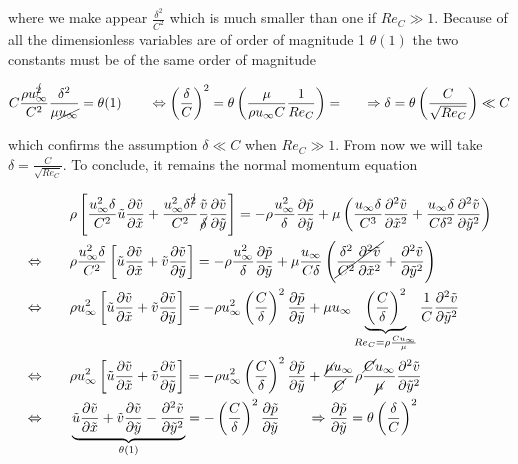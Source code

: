 	where we make appear $\frac{\delta ^2}{C^2}$ which is much smaller than one if $Re_C \gg 1$. Because of all the dimensionless variables are of order of magnitude 1 $\theta (1)$ the two constants must be of the same order of magnitude
	
	\begin{equation}
		C\frac{\rho \uinf ^{\cancel{2}}}{C^2} \frac{\delta ^2}{\mu \cancel{\uinf}} = \theta (1) \qquad \Leftrightarrow \left( \frac{\delta}{C}\right)^2 = \theta \left( \frac{\mu}{\rho \uinf C}\frac{1}{Re _C} \right) =  \qquad \Rightarrow \delta = \theta \left(\frac{C}{\sqrt{Re_C}} \right) \ll C
	\end{equation}
	
	which confirms the assumption $\delta \ll C$ when $Re_C\gg 1$. From now we will take $\delta = \frac{C}{\sqrt{Re_C}}$. To conclude, it remains the normal momentum equation 
	
	\begin{equation}
	\begin{aligned}
		&\rho \left[ \frac{\uinf ^2 \delta}{C^2}\tilde{u} \frac{\D \tilde{v}}{\D \tilde{x}} + \frac{\uinf ^2 \delta^{\cancel{2}}}{C^2} \frac{\tilde{v}}{\cancel{\delta}}\frac{\D \tilde{v}}{\D \tilde{y}} \right] = -\rho \frac{\uinf ^2}{\delta} \frac{\D \tilde{p}}{\D \tilde{y}} + \mu \left( \frac{\uinf \delta}{C^3}\frac{\D ^2 \tilde{v}}{\D \tilde{x}^2} + \frac{\uinf\delta}{C\delta ^{2}}\frac{\D ^2 \tilde{v}}{\D \tilde{y}^2} \right) \\
		\Leftrightarrow\qquad &\rho \frac{\uinf ^2\delta}{C^2}\left[ \tilde{u} \frac{\D \tilde{v}}{\D \tilde{x}} +  \tilde{v} \frac{\D \tilde{v}}{\D \tilde{y}}  \right] = - \rho\frac{\uinf ^2}{\delta} \frac{\D \tilde{p}}{\D \tilde{y}} +  \mu \frac{\uinf }{C\delta} \left( \cancel{\frac{\delta ^2}{C^2}\frac{\D ^2 \tilde{v}}{\D \tilde{x}^2}}+ \frac{\D ^2 \tilde{v}}{\D \tilde{y}^2} \right) \\
		\Leftrightarrow\qquad  &\rho \uinf ^2\left[ \tilde{u} \frac{\D \tilde{v}}{\D \tilde{x}} +  \tilde{v} \frac{\D \tilde{v}}{\D \tilde{y}}  \right] = - \rho\uinf^2\left(\frac{C}{\delta}\right) ^2 \frac{\D \tilde{p}}{\D \tilde{y}} +  \mu\uinf \underbrace{\left(\frac{C}{\delta}\right)^2}_{Re_C = \rho\frac{C\uinf}{\mu}} \frac{1}{C} \frac{\D ^2 \tilde{v}}{\D \tilde{y}^2}\\
		\Leftrightarrow\qquad  &\rho \uinf ^2\left[ \tilde{u} \frac{\D \tilde{v}}{\D \tilde{x}} +  \tilde{v} \frac{\D \tilde{v}}{\D \tilde{y}}  \right] = - \rho\uinf^2\left(\frac{C}{\delta}\right) ^2 \frac{\D \tilde{p}}{\D \tilde{y}} +  \frac{\cancel{\mu}\uinf}{\cancel{C}} \rho\frac{\cancel{C}\uinf}{\cancel{\mu}} \frac{\D ^2 \tilde{v}}{\D \tilde{y}^2}\\
				\Leftrightarrow\qquad  &\underbrace{\tilde{u} \frac{\D \tilde{v}}{\D \tilde{x}} +  \tilde{v} \frac{\D \tilde{v}}{\D \tilde{y}} -  \frac{\D ^2 \tilde{v}}{\D \tilde{y}^2}}_{\theta (1)} = - \left(\frac{C}{\delta}\right) ^2 \frac{\D \tilde{p}}{\D \tilde{y}} \qquad \Rightarrow \frac{\D \tilde{p}}{\D \tilde{y}} = \theta \left(\frac{\delta}{C}\right) ^2 
	\end{aligned}
	\end{equation}

